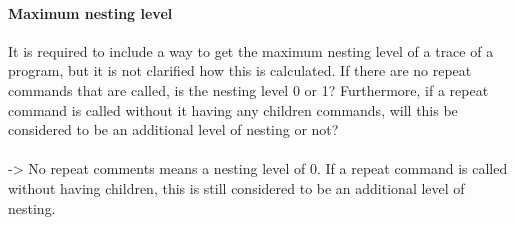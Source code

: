 \paragraph{Maximum nesting level}
It is required to include a way to get the maximum nesting level of a trace of a program, but it is not clarified how this is calculated. If there are no repeat commands that are called, is the nesting level 0 or 1? Furthermore, if a repeat command is called without it having any children commands, will this be considered to be an additional level of nesting or not?\\~\\
-> No repeat comments means a nesting level of 0. If a repeat command is called without having children, this is still considered to be an additional level of nesting. 

